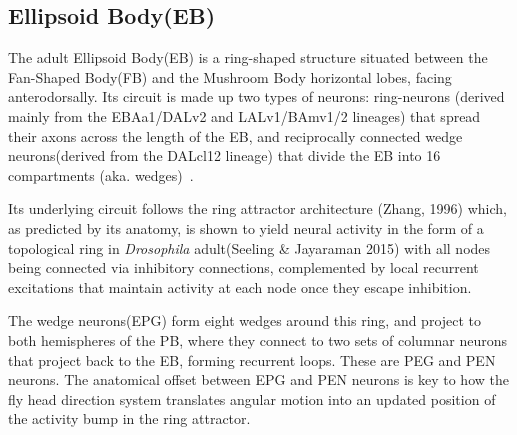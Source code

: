 \documentclass{article}
\begin{document}






\subsection{Ellipsoid Body(EB)}
The adult Ellipsoid Body(EB) is a ring-shaped structure situated between the Fan-Shaped Body(FB) and the Mushroom Body horizontal lobes, facing anterodorsally. Its circuit is made up two types of neurons: ring-neurons (derived mainly from the EBAa1/DALv2 and LALv1/BAmv1/2 lineages) that spread their axons across the length of the EB, and reciprocally connected wedge neurons(derived from the DALcl12 lineage) that divide the EB into 16 compartments (aka. wedges)~\citep{omoto2018neuronal}. 

Its underlying circuit follows the ring attractor architecture (Zhang, 1996) which, as predicted by its anatomy, is shown to yield neural activity in the form of a topological ring in \textit{Drosophila} adult(Seeling \& Jayaraman 2015) with all nodes being connected via inhibitory connections, complemented by local recurrent excitations that maintain activity at each node once they escape inhibition.%

The wedge neurons(EPG) form eight wedges around this ring, and project to both hemispheres of the PB, where they connect to two sets of columnar neurons that project back to the EB, forming recurrent loops. These are PEG and PEN neurons. The anatomical offset between EPG and PEN neurons is key to how the fly head direction system translates angular motion into an updated position of the activity bump in the ring attractor. 
\end{document}
